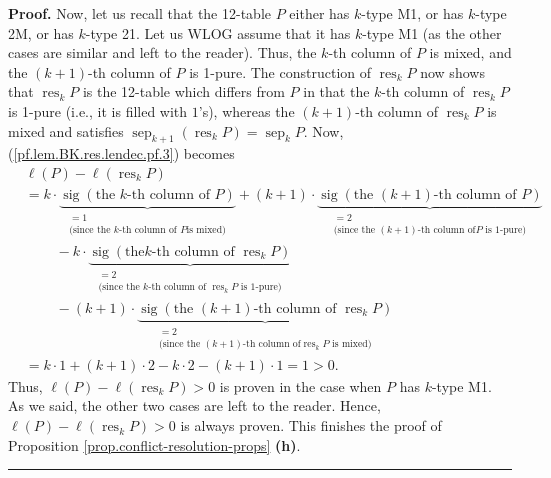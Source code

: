 \documentclass[numbers=enddot,12pt,final,onecolumn,notitlepage]{scrartcl}%
\theoremstyle{definition}
\newenvironment{proof}[1][Proof]{\noindent\textbf{#1.} }{\ \rule{0.5em}{0.5em}}
\begin{document}
\begin{proof}
Now, let us recall that the 12-table $P$ either has $k$-type M1, or has
$k$-type 2M, or has $k$-type 21. Let us WLOG assume that it has $k$-type M1
(as the other cases are similar and left to the reader). Thus, the $k$-th
column of $P$ is mixed, and the $\left(  k+1\right)  $-th column of $P$ is
1-pure. The construction of $\operatorname*{res}\nolimits_{k}P$ now shows that
$\operatorname*{res}_{k}P$ is the 12-table which differs from $P$ in that the
$k$-th column of $\operatorname*{res}_{k}P$ is 1-pure (i.e., it is filled with
$1$'s), whereas the $\left(  k+1\right)  $-th column of $\operatorname*{res}%
\nolimits_{k}P$ is mixed and satisfies $\operatorname*{sep}\nolimits_{k+1}%
\left(  \operatorname*{res}\nolimits_{k}P\right)  =\operatorname*{sep}%
\nolimits_{k}P$. Now, (\ref{pf.lem.BK.res.lendec.pf.3}) becomes%
\begin{align*}
&  \ell\left(  P\right)  -\ell\left(  \operatorname*{res}\nolimits_{k}P\right)
\\
&  =k\cdot\underbrace{\operatorname*{sig}\left(  \text{the }k\text{-th column
of }P\right)  }_{\substack{=1\\\text{(since the }k\text{-th column of }P\text{
is mixed)}}}+\left(  k+1\right)  \cdot\underbrace{\operatorname*{sig}\left(
\text{the }\left(  k+1\right)  \text{-th column of }P\right)  }%
_{\substack{=2\\\text{(since the }\left(  k+1\right)  \text{-th column of
}P\text{ is 1-pure)}}}\\
&  \ \ \ \ \ \ \ \ \ \ -k\cdot\underbrace{\operatorname*{sig}\left(  \text{the
}k\text{-th column of }\operatorname*{res}\nolimits_{k}P\right)
}_{\substack{=2\\\text{(since the }k\text{-th column of }\operatorname*{res}%
\nolimits_{k}P\text{ is 1-pure)}}}\\
&  \ \ \ \ \ \ \ \ \ \ -\left(  k+1\right)  \cdot
\underbrace{\operatorname*{sig}\left(  \text{the }\left(  k+1\right)
\text{-th column of }\operatorname*{res}\nolimits_{k}P\right)  }%
_{\substack{=2\\\text{(since the }\left(  k+1\right)  \text{-th column of
}\operatorname*{res}\nolimits_{k}P\text{ is mixed)}}}\\
&  =k\cdot1+\left(  k+1\right)  \cdot2-k\cdot2-\left(  k+1\right)  \cdot1=1>0.
\end{align*}
Thus, $\ell\left(  P\right)  -\ell\left(  \operatorname*{res}\nolimits_{k}%
P\right)  >0$ is proven in the case when $P$ has $k$-type M1. As we said, the
other two cases are left to the reader. Hence, $\ell\left(  P\right)
-\ell\left(  \operatorname*{res}\nolimits_{k}P\right)  >0$ is always proven.
This finishes the proof of Proposition \ref{prop.conflict-resolution-props}
\textbf{(h)}.
\end{proof}
\end{document}
